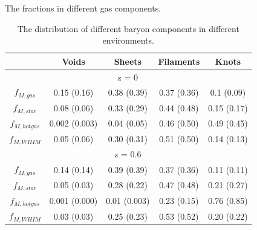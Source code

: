 \documentclass[aspectratio=43]{beamer}
\begin{document}
\begin{frame}{The fractions in different gas components.}
\begin{table}
\fontsize{10}{10}\selectfont
\caption{The distribution of different baryon components in different environments.}
  \begin{tabular}{c|c|c|c|c}
       & Voids & Sheets & Filaments & Knots \\
       \hline
       & & z = 0 & & \\
    $f_{M, gas}$ & 0.15 (0.16) & 0.38 (0.39) & 0.37 (0.36) & 0.1 (0.09) \\
    $f_{M, star}$ & 0.08 (0.06) & 0.33 (0.29) & 0.44 (0.48) & 0.15 (0.17) \\
    $f_{M, hot gas}$ & 0.002 (0.003) & 0.04 (0.05) & 0.46 (0.50) & 0.49 (0.45) \\
    $f_{M, WHIM}$ & 0.05 (0.06) & 0.30 (0.31) & \alert{0.51 (0.50)} & 0.14 (0.13) \\
    \hline
       & & z = 0.6 & & \\
    $f_{M, gas}$ & 0.14 (0.14) & 0.39 (0.39) & 0.37 (0.36) & 0.11 (0.11) \\
    $f_{M, star}$ & 0.05 (0.03) & 0.28 (0.22) & 0.47 (0.48) & 0.21 (0.27) \\
    $f_{M, hot gas}$ & 0.001 (0.000) & 0.01 (0.003) & 0.23 (0.15) & 0.76 (0.85) \\
    $f_{M, WHIM}$ & 0.03 (0.03) & 0.25 (0.23) & \alert{0.53 (0.52)} & 0.20 (0.22) \\ 
  \end{tabular}
\end{table}
\end{frame}
\end{document}
